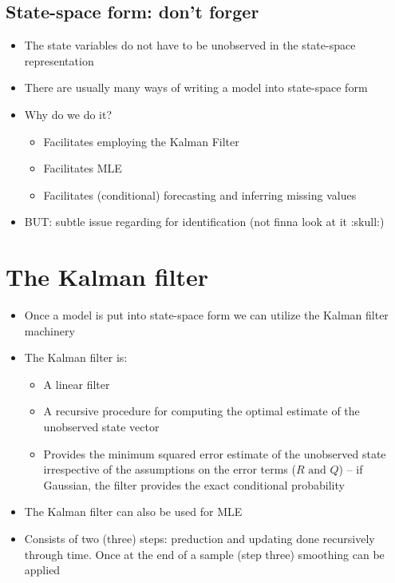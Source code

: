 \documentclass[10pt]{article}
\begin{document}
\subsection{State-space form: don't forger}
\begin{itemize}
    \item The state variables do not have to be unobserved in the state-space representation
    \item There are usually many ways of writing a model into state-space form 
    \item Why do we do it?
    \begin{itemize}
        \item Facilitates employing the Kalman Filter 
        \item Facilitates MLE 
        \item Facilitates (conditional) forecasting and inferring missing values 
    \end{itemize}
    \item BUT: subtle issue regarding for identification (not finna look at it :skull:)
\end{itemize}
\newpage 
\section{The Kalman filter}
\begin{itemize}
    \item Once a model is put into state-space form we can utilize the Kalman filter machinery 
    \item The Kalman filter is: 
    \begin{itemize}
        \item A linear filter 
        \item A recursive procedure for computing the optimal estimate of the unobserved state vector 
        \item Provides the minimum squared error estimate of the unobserved state irrespective of the assumptions on the error terms ($R \text{ and } Q $) -- if Gaussian, the filter provides the exact conditional probability 
    \end{itemize} 
    \item The Kalman filter can also be used for MLE 
    \item Consists of two (three) steps: preduction and updating done recursively through time. Once at the end of a sample (step three) smoothing can be applied 
\end{itemize}
\end{document}
